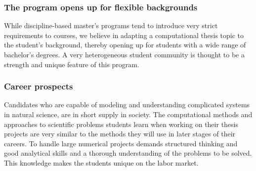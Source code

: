 \documentclass{beamer}
\begin{document}
\begin{frame}
\frametitle{The program opens up for flexible backgrounds}

\begin{block}{}
While discipline-based master's programs tend to introduce very strict
requirements to courses, we believe in adapting a computational thesis
topic to the student's background, thereby opening up for
students with a wide range of bachelor's degrees.
A very heterogeneous student community is thought to be a strength and
unique feature of this program.
\end{block}
\end{frame}

\begin{frame}
\frametitle{Career prospects}

\begin{block}{}
Candidates who are capable of modeling and understanding complicated
systems in natural science, are in short supply in society.  The
computational methods and approaches to scientific problems students learn
when working on their thesis projects are very similar to the methods
they will use in later stages of their careers.  To handle large
numerical projects demands structured thinking and good analytical
skills and a thorough understanding of the problems to be solved. This
knowledge makes the students unique on the labor market.


\end{block}
\end{frame}
\end{document}
